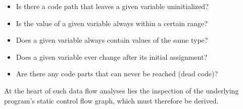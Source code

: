 \begin{itemize}
  \setlength\itemsep{0pt}
  \item Is there a code path that leaves a given variable uninitialized?
  \item Is the value of a given variable always within a certain range?
  \item Does a given variable always contain values of the same type?
  \item Does a given variable ever change after its initial assignment?
  \item Are there any code parts that can never be reached (dead code)?
\end{itemize}

At the heart of such data flow analyses lies the inspection of the underlying program's static control flow graph, which must therefore be derived.
